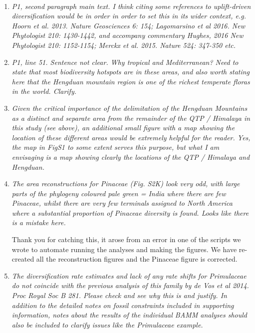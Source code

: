 \documentclass[12pt]{letter}
\begin{document}
\begin{letter}{ \\

}
\begin{enumerate}
\item \textit{P1, second paragraph main text. I think citing some
    references to uplift-driven diversification would be in order in
    order to set this in its wider context, e.g. Hoorn et
    al. 2013. Nature Geosciences 6: 154; Lagomarsino et al 2016. New
    Phytologist 210: 1430-1442, and accompany commentary Hughes, 2016
    New Phytologist 210: 1152-1154; Merckx et al. 2015. Nature 524:
    347-350 etc.}

\item \textit{P1, line 51. Sentence not clear. Why tropical and
    Mediterranean? Need to state that most biodiversity hotspots are
    in these areas, and also worth stating here that the Hengduan
    mountain region is one of the richest temperate floras in the
    world. Clarify.}

\item \textit{Given the critical importance of the delimitation of the
    Hengduan Mountains as a distinct and separate area from the
    remainder of the QTP / Himalaya in this study (see above), an
    additional small figure with a map showing the location of these
    different areas would be extremely helpful for the reader. Yes,
    the map in FigS1 to some extent serves this purpose, but what I am
    envisaging is a map showing clearly the locations of the QTP /
    Himalaya and Hengduan.}

\item \textit{The area reconstructions for Pinaceae (Fig. S2K) look
    very odd, with large parts of the phylogeny coloured pale green =
    India where there are few Pinaceae, whilst there are very few
    terminals assigned to North America where a substantial proportion
    of Pinaceae diversity is found. Looks like there is a mistake
    here.}

  Thank you for catching this, it arose from an error in one of the
  scripts we wrote to automate running the analyses and making the
  figures. We have re-created all the reconstruction figures and the
  Pinaceae figure is corrected.

\item \textit{The diversification rate estimates and lack of any rate
    shifts for Primulaceae do not coincide with the previous analysis
    of this family by de Vos et al 2014. Proc Royal Soc B 281. Please
    check and see why this is and justify. In addition to the detailed
    notes on fossil constraints included in supporting information,
    notes about the results of the individual BAMM analyses should
    also be included to clarify issues like the Primulaceae example.}


\end{enumerate}
\end{letter}
\end{document}
